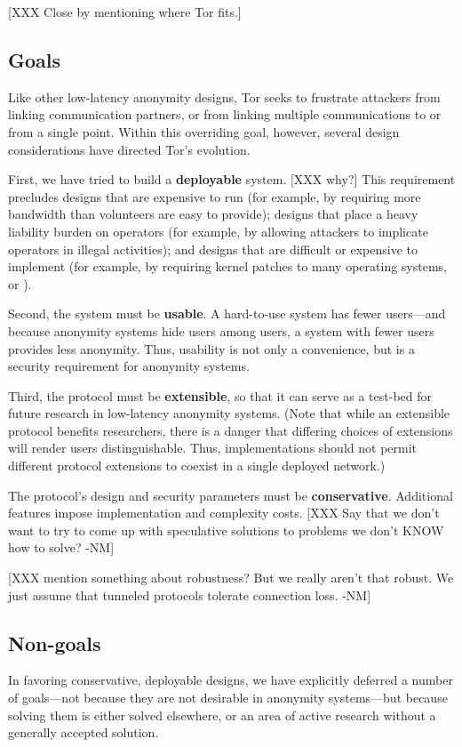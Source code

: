 \documentclass[times,10pt,twocolumn]{article}
\begin{document}
[XXX Close by mentioning where Tor fits.]

\label{sec:assumptions}


\subsection{Goals}
Like other low-latency anonymity designs, Tor seeks to frustrate
attackers from linking communication partners, or from linking
multiple communications to or from a single point.  Within this
overriding goal, however, several design considerations have directed
Tor's evolution.

First, we have tried to build a {\bf deployable} system.  [XXX why?]
This requirement precludes designs that are expensive to run (for
example, by requiring more bandwidth than volunteers are easy to
provide); designs that place a heavy liability burden on operators
(for example, by allowing attackers to implicate operators in illegal
activities); and designs that are difficult or expensive to implement
(for example, by requiring kernel patches to many operating systems,
or ).

Second, the system must be {\bf usable}.  A hard-to-use system has
fewer users---and because anonymity systems hide users among users, a
system with fewer users provides less anonymity.  Thus, usability is
not only a convenience, but is a security requirement for anonymity
systems.

Third, the protocol must be {\bf extensible}, so that it can serve as
a test-bed for future research in low-latency anonymity systems.
(Note that while an extensible protocol benefits researchers, there is
a danger that differing choices of extensions will render users
distinguishable.  Thus, implementations should not permit different
protocol extensions to coexist in a single deployed network.)

The protocol's design and security parameters must be {\bf
conservative}.  Additional features impose implementation and
complexity costs. [XXX Say that we don't want to try to come up with
speculative solutions to problems we don't KNOW how to solve? -NM]

[XXX mention something about robustness?  But we really aren't that
  robust.  We just assume that tunneled protocols tolerate connection
  loss. -NM]

\subsection{Non-goals}
In favoring conservative, deployable designs, we have explicitly
deferred a number of goals---not because they are not desirable in
anonymity systems---but because solving them is either solved
elsewhere, or an area of active research without a generally accepted
solution.
\end{document}
